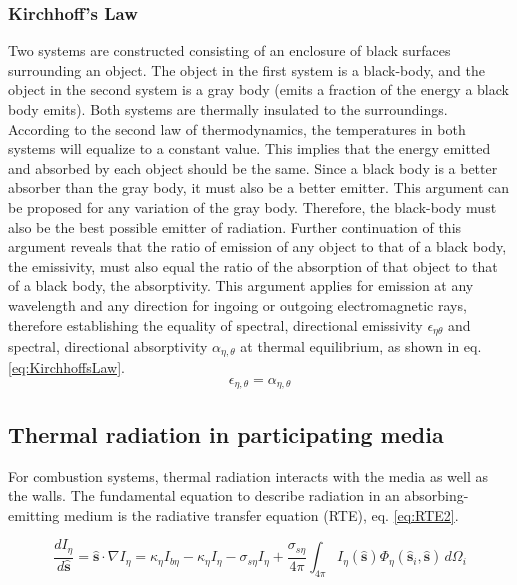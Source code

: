 \subsubsection{Kirchhoff's Law} \label{sec:KirchoffsLaw}
Two systems are constructed consisting of an enclosure of black surfaces surrounding an object. The object in the first system is a black-body, and the object in the second system is a gray body (emits a fraction of the energy a black body emits). Both systems are thermally insulated to the surroundings. 
According to the second law of thermodynamics, the temperatures in both systems will equalize to a constant value. This implies that the energy emitted and absorbed by each object should be the same.
Since a black body is a better absorber than the gray body, it must also be a better emitter. This argument can be proposed for any variation of the gray body. Therefore, the black-body must also be the best possible emitter of radiation.
Further continuation of this argument reveals that the ratio of emission of any object to that of a black body, the emissivity, must also equal the ratio of the absorption of that object to that of a black body, the absorptivity. This argument applies for emission at any wavelength and any direction for ingoing or outgoing electromagnetic rays, therefore establishing the equality of spectral, directional emissivity $\epsilon_{\eta{}\theta{}}$ and spectral, directional absorptivity $\alpha{}_{\eta,\theta}$ at thermal equilibrium, as shown in eq. \ref{eq:KirchhoffsLaw}.
\begin{equation}
    \epsilon{}_{\eta{},\theta{}}=\alpha{}_{\eta{},\theta{}}
    \label{eq:KirchhoffsLaw}
\end{equation}


\subsection{Thermal radiation in participating media} \label{section:RTE}
For combustion systems, thermal radiation interacts with the media as well as the walls. The fundamental equation to describe radiation in an absorbing-emitting medium is the radiative transfer equation (RTE), eq. \ref{eq:RTE2}.

\begin{equation}
    \frac{dI_\eta{}}{d\hat{\textbf{s}}} = \hat{\textbf{s}} \cdot \nabla{I_\eta{}} = \kappa{}_\eta{}I_{b\eta{}}-\kappa{}_\eta{}I_\eta{}-\sigma{}_{s\eta{}}I_\eta{}+\frac{\sigma{}_{s\eta{}}}{4\pi}\int_{4\pi{}}{I_\eta{}(\hat{\textbf{s}})\Phi_\eta{}(\hat{\textbf{s}}_i,\hat{\textbf{s}})}\,d\Omega{}_i
    \label{eq:RTE2}
\end{equation}

